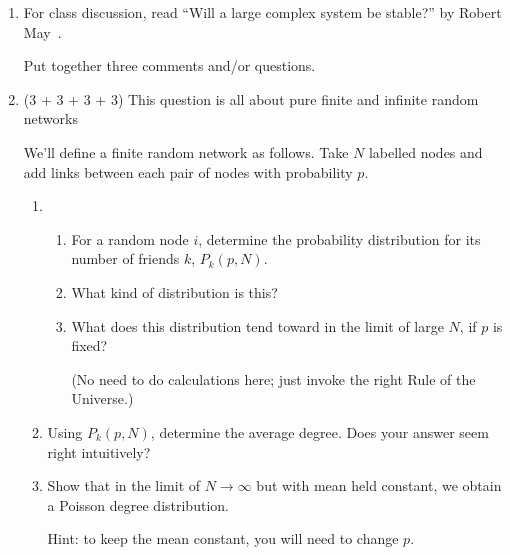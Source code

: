 \begin{enumerate}
  
   \solutionstart


   \solutionend

\item
  
  For class discussion, read ``Will a large complex system be stable?'' by Robert May~\cite{may1972a}.

  Put together three comments and/or questions.


\item (3 + 3 + 3 + 3)
  This question is all about pure 
  finite and infinite random networks

  We'll define a finite random network as follows.  
  Take $N$ labelled nodes and add links between each pair
  of nodes with probability $p$.

  \begin{enumerate}
  \item 
    \begin{enumerate}
    \item 
      For a random node $i$, determine the probability distribution
      for its number of friends $k$, $P_{k}(p,N)$.

    \item 
      What kind of distribution is this?

    \item 
      What does this distribution
      tend toward in the limit of large $N$, if $p$ is fixed?

      (No need to do calculations here; just invoke the right Rule of
      the Universe.)
    \end{enumerate}

    
   \solutionstart


   \solutionend


  \item 
    Using $P_{k}(p,N)$, determine the average degree.
    Does your answer seem right intuitively?

    
   \solutionstart


   \solutionend

  \item 
    Show that in the limit of $N \rightarrow \infty$
    but with mean held constant,
    we obtain a Poisson degree distribution.

    Hint: to keep the mean constant, you will
    need to change $p$.


\end{enumerate}
\end{enumerate}
